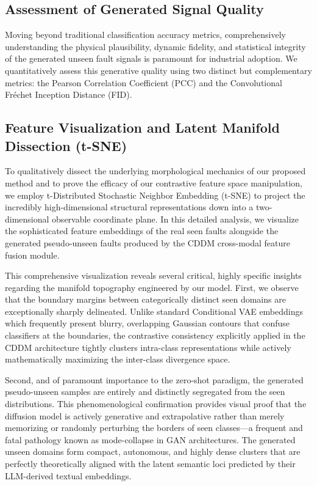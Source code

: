 \subsection{Assessment of Generated Signal Quality}

Moving beyond traditional classification accuracy metrics, comprehensively understanding the physical plausibility, dynamic fidelity, and statistical integrity of the generated unseen fault signals is paramount for industrial adoption. We quantitatively assess this generative quality using two distinct but complementary metrics: the Pearson Correlation Coefficient (PCC) and the Convolutional Fréchet Inception Distance (FID). 

\subsection{Feature Visualization and Latent Manifold Dissection (t-SNE)}

To qualitatively dissect the underlying morphological mechanics of our proposed method and to prove the efficacy of our contrastive feature space manipulation, we employ t-Distributed Stochastic Neighbor Embedding (t-SNE) to project the incredibly high-dimensional structural representations down into a two-dimensional observable coordinate plane. In this detailed analysis, we visualize the sophisticated feature embeddings of the real seen faults alongside the generated pseudo-unseen faults produced by the CDDM cross-modal feature fusion module.

This comprehensive visualization reveals several critical, highly specific insights regarding the manifold topography engineered by our model. First, we observe that the boundary margins between categorically distinct seen domains are exceptionally sharply delineated. Unlike standard Conditional VAE embeddings which frequently present blurry, overlapping Gaussian contours that confuse classifiers at the boundaries, the contrastive consistency explicitly applied in the CDDM architecture tightly clusters intra-class representations while actively mathematically maximizing the inter-class divergence space. 

Second, and of paramount importance to the zero-shot paradigm, the generated pseudo-unseen samples are entirely and distinctly segregated from the seen distributions. This phenomenological confirmation provides visual proof that the diffusion model is actively generative and extrapolative rather than merely memorizing or randomly perturbing the borders of seen classes—a frequent and fatal pathology known as mode-collapse in GAN architectures. The generated unseen domains form compact, autonomous, and highly dense clusters that are perfectly theoretically aligned with the latent semantic loci predicted by their LLM-derived textual embeddings. 

